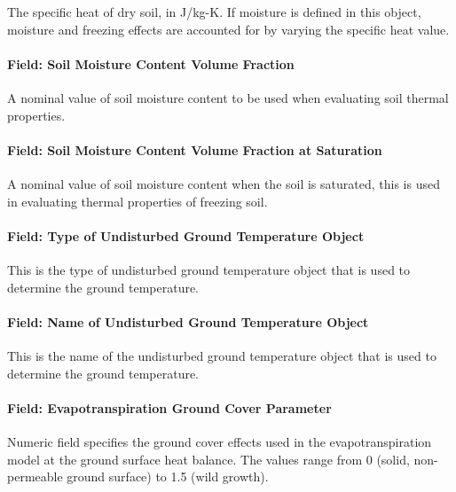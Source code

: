 The specific heat of dry soil, in J/kg-K. If moisture is defined in this object, moisture and freezing effects are accounted for by varying the specific heat value.

\paragraph{Field: Soil Moisture Content Volume Fraction}\label{field-soil-moisture-content-volume-fraction-1}

A nominal value of soil moisture content to be used when evaluating soil thermal properties.

\paragraph{Field: Soil Moisture Content Volume Fraction at Saturation}\label{field-soil-moisture-content-volume-fraction-at-saturation-1}

A nominal value of soil moisture content when the soil is saturated, this is used in evaluating thermal properties of freezing soil.

\paragraph{Field: Type of Undisturbed Ground Temperature Object}\label{field-type-of-undisturbed-ground-temperature-object-000}

This is the type of undisturbed ground temperature object that is used to determine the ground temperature.

\paragraph{Field: Name of Undisturbed Ground Temperature Object}\label{field-name-of-undisturbed-ground-temperature-object-000}

This is the name of the undisturbed ground temperature object that is used to determine the ground temperature.

\paragraph{Field: Evapotranspiration Ground Cover Parameter}\label{field-evapotranspiration-ground-cover-parameter-1}

Numeric field specifies the ground cover effects used in the evapotranspiration model at the ground surface heat balance. The values range from 0 (solid, non-permeable ground surface) to 1.5 (wild growth).

